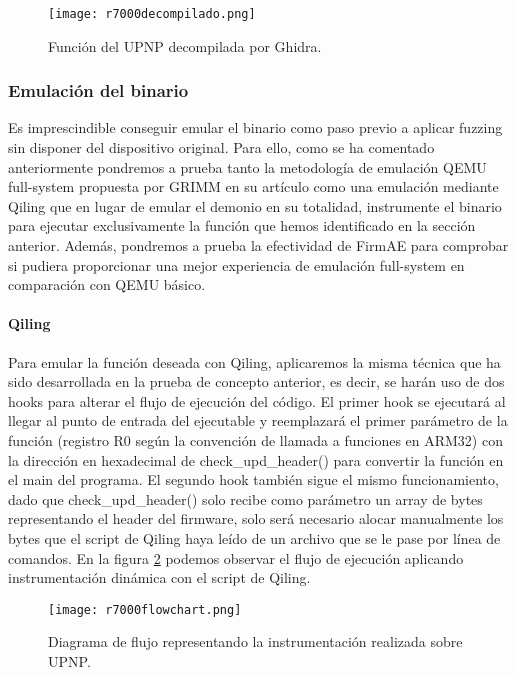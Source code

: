 \begin{figure}[H]
    \centering
    \texttt{[image: r7000decompilado.png]}
    \caption{Función del UPNP decompilada por Ghidra.}
    \label{fig:R7000decompilado}
\end{figure}

\subsubsection{Emulación del binario}
Es imprescindible conseguir emular el binario como paso previo a aplicar fuzzing sin disponer del dispositivo original. Para ello, como se ha comentado 
anteriormente pondremos a prueba tanto la metodología de emulación QEMU full-system propuesta por GRIMM en su artículo como una emulación mediante 
Qiling\cite{qiling} que en lugar de emular el demonio en su totalidad, instrumente el binario para ejecutar exclusivamente la función que hemos identificado 
en la sección anterior. Además, pondremos a prueba la efectividad de FirmAE\cite{Kim2020} para comprobar si pudiera proporcionar una mejor experiencia de 
emulación full-system en comparación con QEMU básico.

\paragraph{Qiling}
Para emular la función deseada con Qiling, aplicaremos la misma técnica que ha sido desarrollada en la prueba de concepto anterior, es decir, se harán uso 
de dos hooks para alterar el flujo de ejecución del código. El primer hook se ejecutará al llegar al punto de entrada del ejecutable y reemplazará el primer 
parámetro de la función (registro R0 según la convención de llamada a funciones en ARM32) con la dirección en hexadecimal de check\_upd\_header() para convertir 
la función en el main del programa. El segundo hook también sigue el mismo funcionamiento, dado que check\_upd\_header() solo recibe como parámetro un array 
de bytes representando el header del firmware, solo será necesario alocar manualmente los bytes que el script de Qiling haya leído de un archivo que se le 
pase por línea de comandos. En la figura \ref{fig:R7000flowchart} podemos observar el flujo de ejecución aplicando instrumentación 
dinámica con el script de Qiling.

\begin{figure}[H]
    \centering
    \texttt{[image: r7000flowchart.png]}
    \caption{Diagrama de flujo representando la instrumentación realizada sobre UPNP.}
    \label{fig:R7000flowchart}
\end{figure}

